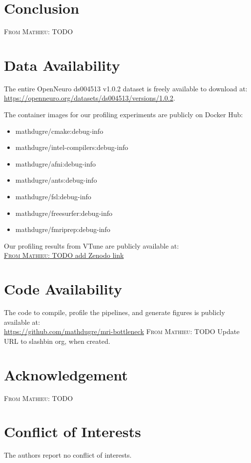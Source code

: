 \documentclass[conference]{IEEEtran}
\newcommand{\MD}[1]{\color{magenta}\textsc{From Mathieu: }#1\color{black}}
\begin{document}
\section{Conclusion}
\MD{TODO}
			
			
\section{Data Availability}
\label{sec:data-availability}
The entire OpenNeuro ds004513 v1.0.2 dataset is freely available to download at:
\\\href{https://openneuro.org/datasets/ds004513/versions/1.0.2}{https://openneuro.org/datasets/ds004513/versions/1.0.2}.
	
The container images for our profiling experiments are publicly on Docker Hub:
\begin{itemize}
	\item mathdugre/cmake:debug-info
	\item mathdugre/intel-compilers:debug-info
	\item mathdugre/afni:debug-info
	\item mathdugre/ants:debug-info
	\item mathdugre/fsl:debug-info
	\item mathdugre/freesurfer:debug-info
	\item mathdugre/fmriprep:debug-info
\end{itemize}
	
Our profiling results from VTune are publicly available at:
\\\href{URL}{\MD{TODO add Zenodo link}}
	
\section{Code Availability}
\label{sec:code-availability}
The code to compile, profile the pipelines, and generate figures is publicly available at:
\\\href{https://github.com/mathdugre/mri-bottleneck}{https://github.com/mathdugre/mri-bottleneck}
\MD{TODO Update URL to slashbin org, when created.}
													
\section*{Acknowledgement}
\MD{TODO}
													
\section*{Conflict of Interests}
The authors report no conflict of interests.
													
\end{document}
